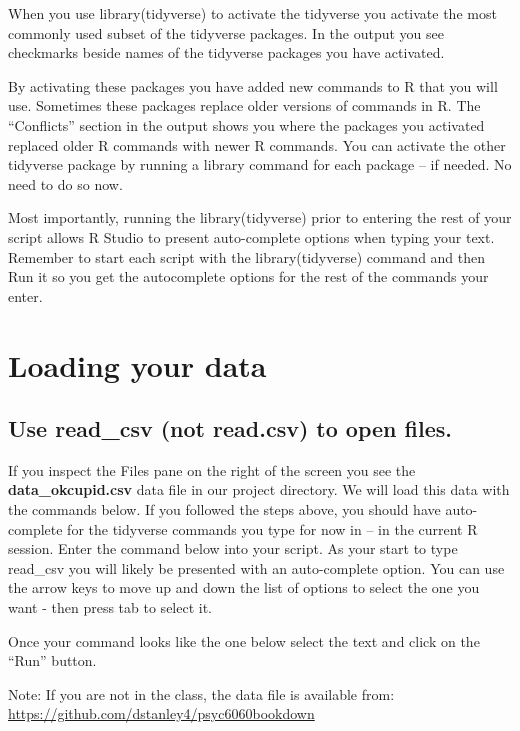 \documentclass[
]{krantz}
\begin{document}
When you use library(tidyverse) to activate the tidyverse you activate the most commonly used subset of the tidyverse packages. In the output you see checkmarks beside names of the tidyverse packages you have activated.

By activating these packages you have added new commands to R that you will use. Sometimes these packages replace older versions of commands in R. The ``Conflicts'' section in the output shows you where the packages you activated replaced older R commands with newer R commands. You can activate the other tidyverse package by running a library command for each package -- if needed. No need to do so now.

Most importantly, running the library(tidyverse) prior to entering the rest of your script allows R Studio to present auto-complete options when typing your text. Remember to start each script with the library(tidyverse) command and then Run it so you get the autocomplete options for the rest of the commands your enter.

\hypertarget{loading-your-data}{%
\section{Loading your data}\label{loading-your-data}}

\hypertarget{use-read_csv-not-read.csv-to-open-files.}{%
\subsection{Use read\_csv (not read.csv) to open files.}\label{use-read_csv-not-read.csv-to-open-files.}}

If you inspect the Files pane on the right of the screen you see the \textbf{data\_okcupid.csv} data file in our project directory. We will load this data with the commands below. If you followed the steps above, you should have auto-complete for the tidyverse commands you type for now in -- in the current R session. Enter the command below into your script. As your start to type read\_csv you will likely be presented with an auto-complete option. You can use the arrow keys to move up and down the list of options to select the one you want - then press tab to select it.

Once your command looks like the one below select the text and click on the ``Run'' button.

Note: If you are not in the class, the data file is available from: \url{https://github.com/dstanley4/psyc6060bookdown}
\end{document}
